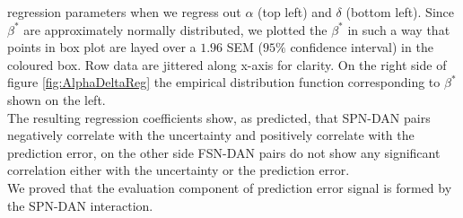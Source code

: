 regression parameters when we regress out $\alpha$ (top left) and $\delta$ (bottom left). Since $\beta^*$ are approximately normally distributed, we plotted the $\beta^*$ in such a way that points in box plot are layed over a $1.96$ SEM ($95\%$ confidence interval) in the coloured box. Row data are jittered along x-axis for clarity. On the right side of figure \ref{fig:AlphaDeltaReg} the empirical distribution function corresponding to $\beta^*$ shown on the left.\\
The resulting regression coefficients show, as predicted, that SPN-DAN pairs negatively correlate with the uncertainty and positively correlate with the prediction error, on the other side FSN-DAN pairs do not show any significant correlation either with the uncertainty or the prediction error.\\We proved that the evaluation component of prediction error signal is formed by the SPN-DAN interaction. 
